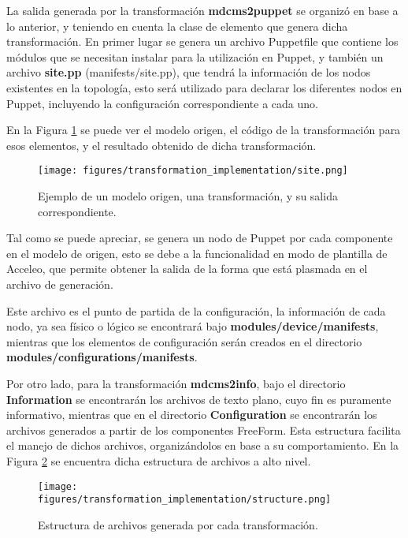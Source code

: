 La salida generada por la transformación \textbf{mdcms2puppet} se organizó en base a lo anterior, y teniendo en cuenta la clase de elemento que genera dicha transformación. En primer lugar se genera un archivo Puppetfile que contiene los módulos que se necesitan instalar para la utilización en Puppet, y también un archivo \textbf{site.pp} (manifests/site.pp), que tendrá la información de los nodos existentes en la topología, esto será utilizado para declarar los diferentes nodos en Puppet, incluyendo la configuración correspondiente a cada uno.

En la Figura \ref{fig:transformation:site} se puede ver el modelo origen, el código de la transformación para esos elementos, y el resultado obtenido de dicha transformación.

\begin{figure}[htbp]
    \centering
    \texttt{[image: figures/transformation\_implementation/site.png]}
    \caption{Ejemplo de un modelo origen, una transformación, y su salida correspondiente.}
    \label{fig:transformation:site}
\end{figure}

Tal como se puede apreciar, se genera un nodo de Puppet por cada componente en el modelo de origen, esto se debe a la funcionalidad en modo de plantilla de Acceleo, que permite obtener la salida de la forma que está plasmada en el archivo de generación.

Este archivo es el punto de partida de la configuración, la información de cada nodo, ya sea físico o lógico se encontrará bajo \textbf{modules/device/manifests}, mientras que los elementos de configuración serán creados en el directorio \textbf{modules/configurations/manifests}.

Por otro lado, para la transformación \textbf{mdcms2info}, bajo el directorio \textbf{Information} se encontrarán los archivos de texto plano, cuyo fin es puramente informativo, mientras que en el directorio \textbf{Configuration} se encontrarán los archivos generados a partir de los componentes FreeForm. Esta estructura facilita el manejo de dichos archivos, organizándolos en base a su comportamiento. En la Figura \ref{fig:transformation:structure} se encuentra dicha estructura de archivos a alto nivel.

\begin{figure}[htbp]
    \centering
    \texttt{[image: figures/transformation\_implementation/structure.png]}
    \caption{Estructura de archivos generada por cada transformación.}
    \label{fig:transformation:structure}
\end{figure}

